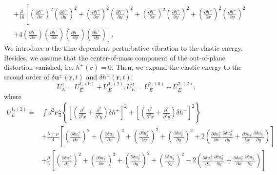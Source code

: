 \documentclass[aps,prx,10pt,twocolumn,superscriptaddress]{revtex4}
\begin{document}
\begin{widetext}
\begin{align}
&+\frac{\mu}{16}\left[ \left(\frac{\partial h^{-}}{\partial x}\right)^{2}\left(\frac{\partial h^{-}}{\partial y}\right)^{2} + \left(\frac{\partial h^{+}}{\partial x}\right)^{2}\left(\frac{\partial h^{-}}{\partial y}\right)^{2} + \left(\frac{\partial h^{-}}{\partial x}\right)^{2}\left(\frac{\partial h^{+}}{\partial y}\right)^{2} + \left(\frac{\partial h^{+}}{\partial x}\right)^{2}\left(\frac{\partial h^{+}}{\partial y}\right)^{2} \right.\nonumber \\
&\left. +4 \left(\frac{\partial h^{-}}{\partial x}\right)\left(\frac{\partial h^{+}}{\partial x}\right) \left(\frac{\partial h^{-}}{\partial y}\right)\left(\frac{\partial h^{+}}{\partial y}\right) \right].
\end{align}
We introduce a the time-dependent perturbative vibration to the elastic energy. Besides, we assume that the center-of-mass component of the out-of-plane distortion vanished, i.e. $h^{+}(\textbf{r})=0$. Then, we expand the elastic energy to the second order of $\delta\textbf{u}^{\pm}(\textbf{r},t)$ and $\delta h^{\pm}(\textbf{r},t)$:
\begin{equation}
U^{1}_{E}=U^{1,(0)}_{E}+U^{1,(2)}_{E}, U^{2}_{E}=U^{2,(0)}_{E}+U^{2,(2)}_{E},
\end{equation} 
where
\allowdisplaybreaks
\begin{align}
U^{1,(2)}_{E}= &\int d^{2}\textbf{r} \frac{\kappa}{4}\left\{\left[ \left( \frac{\partial^{2} }{\partial^{2} x}+\frac{\partial^{2} }{\partial^{2} y} \right) \delta h^{+} \right]^{2} + \left[ \left( \frac{\partial^{2} }{\partial^{2} x}+\frac{\partial^{2} }{\partial^{2} y} \right) \delta h^{-} \right]^{2}\right\}\nonumber\\
&+\frac{\lambda+\mu}{4}\left[ \left( \frac{\partial \delta u^{+}_{x}}{\partial x} \right)^{2} + \left( \frac{\partial \delta u^{-}_{x}}{\partial x} \right)^{2} + \left( \frac{\partial \delta u^{+}_{y}}{\partial y} \right)^{2} + \left( \frac{\partial \delta u^{-}_{y}}{\partial y} \right)^{2} +2\left( \frac{\partial \delta u^{+}_{x}}{\partial x}\frac{\partial \delta u^{+}_{y}}{\partial y}+\frac{\partial \delta u^{-}_{x}}{\partial x}\frac{\partial \delta u^{-}_{y}}{\partial y} \right) \right]\nonumber\\
&+\frac{\mu}{4}\left[ \left( \frac{\partial \delta u^{+}_{x}}{\partial x} \right)^{2} + \left( \frac{\partial \delta u^{-}_{x}}{\partial x} \right)^{2} + \left( \frac{\partial \delta u^{+}_{y}}{\partial y} \right)^{2} + \left( \frac{\partial \delta u^{-}_{y}}{\partial y} \right)^{2} -2\left( \frac{\partial \delta u^{+}_{x}}{\partial x}\frac{\partial \delta u^{+}_{y}}{\partial y}+\frac{\partial \delta u^{-}_{x}}{\partial x}\frac{\partial \delta u^{-}_{y}}{\partial y} \right) \right]\nonumber\\

\end{align}
\end{widetext}
\end{document}
